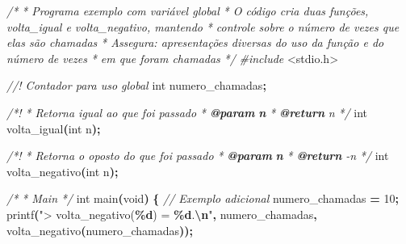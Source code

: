\documentclass[
  11pt,
  a4paper,
]{scrbook}
\newenvironment{Shaded}{\begin{snugshade}}{\end{snugshade}}
\newcommand{\AnnotationTok}[1]{\textcolor[rgb]{0.56,0.35,0.01}{\textbf{\textit{#1}}}}
\newcommand{\CommentTok}[1]{\textcolor[rgb]{0.56,0.35,0.01}{\textit{#1}}}
\newcommand{\CommentVarTok}[1]{\textcolor[rgb]{0.56,0.35,0.01}{\textbf{\textit{#1}}}}
\newcommand{\DataTypeTok}[1]{\textcolor[rgb]{0.13,0.29,0.53}{#1}}
\newcommand{\DecValTok}[1]{\textcolor[rgb]{0.00,0.00,0.81}{#1}}
\newcommand{\ImportTok}[1]{#1}
\newcommand{\NormalTok}[1]{#1}
\newcommand{\OperatorTok}[1]{\textcolor[rgb]{0.81,0.36,0.00}{\textbf{#1}}}
\newcommand{\PreprocessorTok}[1]{\textcolor[rgb]{0.56,0.35,0.01}{\textit{#1}}}
\newcommand{\SpecialCharTok}[1]{\textcolor[rgb]{0.81,0.36,0.00}{\textbf{#1}}}
\newcommand{\StringTok}[1]{\textcolor[rgb]{0.31,0.60,0.02}{#1}}
\begin{document}
\begin{Shaded}
\begin{Highlighting}[]
\CommentTok{/*}
\CommentTok{ * Programa exemplo com variável global}
\CommentTok{ * O código cria duas funções, volta\_igual e volta\_negativo, mantendo}
\CommentTok{ *      controle sobre o número de vezes que elas são chamadas}
\CommentTok{ * Assegura: apresentações diversas do uso da função e do número de vezes}
\CommentTok{ *      em que foram chamadas}
\CommentTok{ */}
\PreprocessorTok{\#include }\ImportTok{\textless{}stdio.h\textgreater{}}

\CommentTok{//! Contador para uso global}
\DataTypeTok{int}\NormalTok{ numero\_chamadas}\OperatorTok{;}

\CommentTok{/*!}
\CommentTok{ * Retorna igual ao que foi passado}
\CommentTok{ * }\AnnotationTok{@param}\CommentTok{ }\CommentVarTok{n}
\CommentTok{ * }\AnnotationTok{@return}\CommentTok{ n}
\CommentTok{ */}
\DataTypeTok{int}\NormalTok{ volta\_igual}\OperatorTok{(}\DataTypeTok{int}\NormalTok{ n}\OperatorTok{);}

\CommentTok{/*!}
\CommentTok{ * Retorna o oposto do que foi passado}
\CommentTok{ * }\AnnotationTok{@param}\CommentTok{ }\CommentVarTok{n}
\CommentTok{ * }\AnnotationTok{@return}\CommentTok{ {-}n}
\CommentTok{ */}
\DataTypeTok{int}\NormalTok{ volta\_negativo}\OperatorTok{(}\DataTypeTok{int}\NormalTok{ n}\OperatorTok{);}

\CommentTok{/*}
\CommentTok{ * Main}
\CommentTok{ */}
\DataTypeTok{int}\NormalTok{ main}\OperatorTok{(}\DataTypeTok{void}\OperatorTok{)} \OperatorTok{\{}
    \CommentTok{// Exemplo adicional }
\NormalTok{    numero\_chamadas }\OperatorTok{=} \DecValTok{10}\OperatorTok{;}
\NormalTok{    printf}\OperatorTok{(}\StringTok{"\textgreater{} volta\_negativo(}\SpecialCharTok{\%d}\StringTok{) = }\SpecialCharTok{\%d}\StringTok{.}\SpecialCharTok{\textbackslash{}n}\StringTok{"}\OperatorTok{,}\NormalTok{ numero\_chamadas}\OperatorTok{,}
\NormalTok{           volta\_negativo}\OperatorTok{(}\NormalTok{numero\_chamadas}\OperatorTok{));}


\end{Highlighting}
\end{Shaded}
\end{document}
